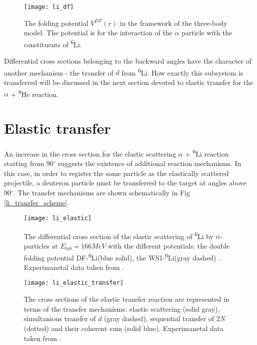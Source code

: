 \documentclass[
12pt, %
oneside, %
english, %
onehalfspacing, %
onehalfspacing, %
headsepline, %
]{MastersDoctoralThesis} %
\newcommand{\he}{\textsuperscript{6}He\xspace}
\newcommand{\li}{\textsuperscript{6}Li\xspace}
\begin{document}
 \begin{figure}[bp!]
\centering
\texttt{[image: li\_df]}
\decoRule
\caption{  \footnotesize  The folding potential $V^{DF}(r)$ in the framework of the three-body model. The potential is for the interaction of the $\alpha$ particle with the constituents of \li.
}
\label{li_df}
\end{figure}

 Differential cross sections belonging to the backward angles have the character of another mechanism - the transfer of $d$ from \li. 
 How exactly this subsystem is transferred will be discussed in the next section devoted to elastic transfer for the $ \alpha$ + \he reaction.
 



\section{Elastic transfer}
An increase in the cross section for the elastic scattering $\alpha$ + \li  reaction starting from 90$^\circ$ suggests the existence of additional reaction mechanisms.
 In this case, in order to register the same particle as the elastically scattered projectile, a deuteron particle must be transferred to the target at angles above 90$^\circ$. 
 The transfer mechanisms are shown schematically in Fig \ref{li_transfer_scheme}.


\begin{figure}
\centering
\texttt{[image: li\_elastic]}
\decoRule
\caption{  \footnotesize  The differential cross section of the elastic scattering of \li by $\alpha$-particles at $E_{lab} = 166 MeV$ with the different potentials: the double folding potential DF-\li (blue solid), the WS1-\li  (gray dashed) \cite{oganessian1999dynamics}. Experimanetal data taken from \cite{oganessian1999dynamics}.
}
\label{li_elastic}
\end{figure}
\begin{figure}
\centering
\texttt{[image: li\_elastic\_transfer]}
\decoRule
\caption{  \footnotesize  The cross sections of the elastic transfer reaction are represented in terms of the transfer mechanisms: elastic scattering (solid gray), simultanious transfer of $d$ (gray dashed), sequential transfer of $2N$ (dotted) and their coherent sum (solid blue). Experimanetal data taken from \cite{oganessian1999dynamics}.
}
\label{li_elastic_transfer}
\end{figure}
\end{document}
